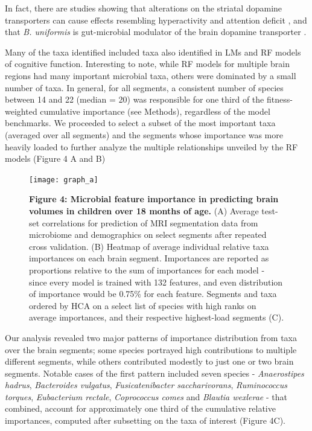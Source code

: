 \documentclass[a4paper]{article}
\begin{document}
In fact, there are studies showing that alterations on the striatal
dopamine transporters can cause effects resembling hyperactivity and
attention deficit
\cite{yaelDisinhibitionNucleusAccumbens2019},
and that \emph{B. uniformis} is gut-microbial modulator of the brain
dopamine transporter
\cite{hartstraInfusionDonorFeces2020}.


Many of the taxa identified included taxa also identified in LMs and RF
models of cognitive function. Interesting to note, while RF models for
multiple brain regions had many important microbial taxa, others were
dominated by a small number of taxa. In general, for all segments, a
consistent number of species between 14 and 22 (median = 20) was
responsible for one third of the fitness-weighted cumulative importance
(see Methods), regardless of the model benchmarks. We proceeded to
select a subset of the most important taxa (averaged over all segments)
and the segments whose importance was more heavily loaded to further
analyze the multiple relationships unveiled by the RF models
(Figure 4 A and B)

\begin{figure}[h]
    \centering
    \texttt{[image: graph\_a]}
    \caption{
        \textbf{Figure 4: Microbial feature importance in predicting brain volumes in children over 18 months of age.}
        (A) Average test-set correlations for prediction of MRI segmentation
        data from microbiome and demographics on select segments after repeated
        cross validation. (B) Heatmap of average individual relative taxa
        importances on each brain segment. Importances are reported as
        proportions relative to the sum of importances for each model - since
        every model is trained with 132 features, and even distribution of
        importance would be 0.75\% for each feature. Segments and taxa ordered
        by HCA on a select list of species with high ranks on average importances,
        and their respective highest-load segments (C).
    }
    \label{fig:x cubed graph}
\end{figure}

Our analysis revealed two major patterns of importance distribution from
taxa over the brain segments; some species portrayed high contributions
to multiple different segments, while others contributed modestly to
just one or two brain segments. Notable cases of the first pattern
included seven species - \emph{Anaerostipes hadrus}, \emph{Bacteroides
vulgatus}, \emph{Fusicatenibacter saccharivorans}, \emph{Ruminococcus
torques}, \emph{Eubacterium rectale}, \emph{Coprococcus comes} and
\emph{Blautia wexlerae} - that combined, account for approximately one
third of the cumulative relative importances, computed after subsetting
on the taxa of interest (Figure 4C).
\end{document}
